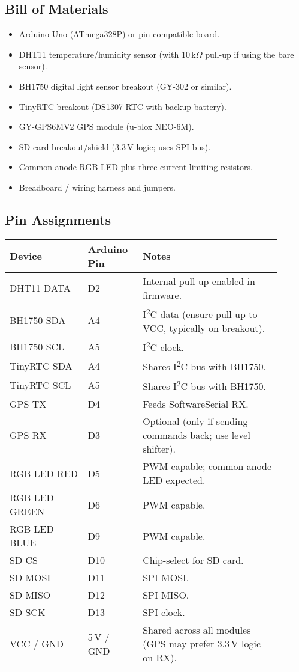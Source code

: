 \documentclass[11pt,a4paper]{article}
\begin{document}
\subsection{Bill of Materials}

\begin{itemize}
  \item Arduino Uno (ATmega328P) or pin-compatible board.
  \item DHT11 temperature/humidity sensor (with 10\,k$\Omega$ pull-up if using the bare sensor).
  \item BH1750 digital light sensor breakout (GY-302 or similar).
  \item TinyRTC breakout (DS1307 RTC with backup battery).
  \item GY-GPS6MV2 GPS module (u-blox NEO-6M).
  \item SD card breakout/shield (3.3\,V logic; uses SPI bus).
  \item Common-anode RGB LED plus three current-limiting resistors.
  \item Breadboard / wiring harness and jumpers.
\end{itemize}

\subsection{Pin Assignments}

\begin{longtable}{>{\ttfamily}p{0.26\linewidth}p{0.18\linewidth}p{0.46\linewidth}}
\textbf{Device} & \textbf{Arduino Pin} & \textbf{Notes} \\
\hline
DHT11 DATA & D2 & Internal pull-up enabled in firmware. \\
BH1750 SDA & A4 & I\textsuperscript{2}C data (ensure pull-up to VCC, typically on breakout). \\
BH1750 SCL & A5 & I\textsuperscript{2}C clock. \\
TinyRTC SDA & A4 & Shares I\textsuperscript{2}C bus with BH1750. \\
TinyRTC SCL & A5 & Shares I\textsuperscript{2}C bus with BH1750. \\
GPS TX & D4 & Feeds SoftwareSerial RX. \\
GPS RX & D3 & Optional (only if sending commands back; use level shifter). \\
RGB LED RED & D5 & PWM capable; common-anode LED expected. \\
RGB LED GREEN & D6 & PWM capable. \\
RGB LED BLUE & D9 & PWM capable. \\
SD CS & D10 & Chip-select for SD card. \\
SD MOSI & D11 & SPI MOSI. \\
SD MISO & D12 & SPI MISO. \\
SD SCK & D13 & SPI clock. \\
VCC / GND & 5\,V / GND & Shared across all modules (GPS may prefer 3.3\,V logic on RX). \\
\end{longtable}
\end{document}
